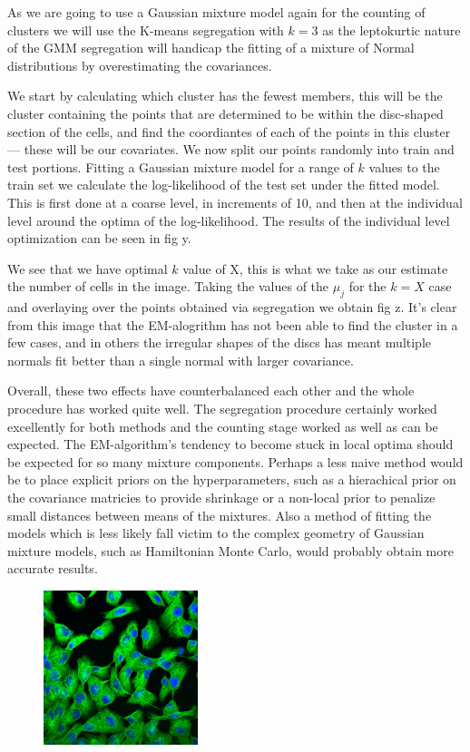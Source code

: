 \documentclass[a4paper]{article}
\begin{document}
As we are going to use a Gaussian mixture model again for the counting of clusters we will use the K-means segregation with $k = 3$ as the leptokurtic nature of the GMM segregation will handicap the fitting of a mixture of Normal distributions by overestimating the covariances.

We start by calculating which cluster has the fewest members, this will be the cluster containing the points that are determined to be within the disc-shaped section of the cells, and find the coordiantes of each of the points in this cluster --- these will be our covariates. We now split our points randomly into train and test portions. Fitting a Gaussian mixture model for a range of $k$ values to the train set we calculate the log-likelihood of the test set under the fitted model. This is first done at a coarse level, in increments of 10, and then at the individual level around the optima of the log-likelihood. The results of the individual level optimization can be seen in fig y.

We see that we have optimal $k$ value of X, this is what we take as our estimate the number of cells in the image. Taking the values of the $\mu_j$ for the $k = X$ case and overlaying over the points obtained via segregation we obtain fig z. It's clear from this image that the EM-alogrithm has not been able to find the cluster in a few cases, and in others the irregular shapes of the discs has meant multiple normals fit better than a single normal with larger covariance. 

Overall, these two effects have counterbalanced each other and the whole procedure has worked quite well. The segregation procedure certainly worked excellently for both methods and the counting stage worked as well as can be expected. The EM-algorithm's tendency to become stuck in local optima should be expected for so many mixture components. Perhaps a less naive method would be to place explicit priors on the hyperparameters, such as a hierachical prior on the covariance matricies to provide shrinkage or a non-local prior to penalize small distances between means of the mixtures. Also a method of fitting the models which is less likely fall victim to the complex geometry of Gaussian mixture models, such as Hamiltonian Monte Carlo, would probably obtain more accurate results.

\begin{figure}[p]
\centering
\includegraphics[width=0.4\textwidth]{original}
\label{fig:original}
\end{figure}
\end{document}
